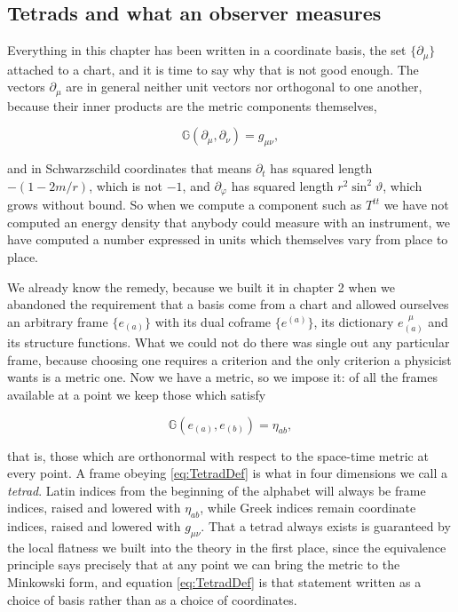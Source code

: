     \subsection{Tetrads and what an observer measures}

        Everything in this chapter has been written in a coordinate basis, the set $\{\partial_{\mu}\}$ attached to a chart, and it is time to say why that is not good enough. The vectors $\partial_{\mu}$ are in general neither unit vectors nor orthogonal to one another, because their inner products are the metric components themselves,

        \begin{equation}\label{eq:CoordBasisInner}
            \mathbb{G}\left(\partial_{\mu},\partial_{\nu}\right) = g_{\mu\nu},
        \end{equation}

        and in Schwarzschild coordinates that means $\partial_t$ has squared length $-(1-2m/r)$, which is not $-1$, and $\partial_{\varphi}$ has squared length $r^2\sin^2\vartheta$, which grows without bound. So when we compute a component such as $T^{tt}$ we have not computed an energy density that anybody could measure with an instrument, we have computed a number expressed in units which themselves vary from place to place.

        We already know the remedy, because we built it in chapter 2 when we abandoned the requirement that a basis come from a chart and allowed ourselves an arbitrary frame $\{e_{(a)}\}$ with its dual coframe $\{e^{(a)}\}$, its dictionary $e_{(a)}^{\;\;\mu}$ and its structure functions. What we could not do there was single out any particular frame, because choosing one requires a criterion and the only criterion a physicist wants is a metric one. Now we have a metric, so we impose it: of all the frames available at a point we keep those which satisfy

        \begin{equation}\label{eq:TetradDef}
            \mathbb{G}\left(e_{(a)},e_{(b)}\right) = \eta_{ab},
        \end{equation}

        that is, those which are orthonormal with respect to the space-time metric at every point. A frame obeying \ref{eq:TetradDef} is what in four dimensions we call a \textit{tetrad}. Latin indices from the beginning of the alphabet will always be frame indices, raised and lowered with $\eta_{ab}$, while Greek indices remain coordinate indices, raised and lowered with $g_{\mu\nu}$. That a tetrad always exists is guaranteed by the local flatness we built into the theory in the first place, since the equivalence principle says precisely that at any point we can bring the metric to the Minkowski form, and equation \ref{eq:TetradDef} is that statement written as a choice of basis rather than as a choice of coordinates.

